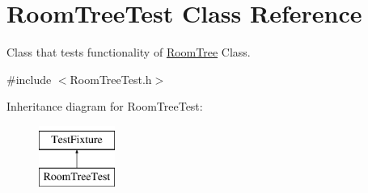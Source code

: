 \hypertarget{classRoomTreeTest}{\section{Room\-Tree\-Test Class Reference}
\label{classRoomTreeTest}
}


Class that tests functionality of \hyperlink{classRoomTree}{Room\-Tree} Class.  




{\ttfamily \#include $<$Room\-Tree\-Test.\-h$>$}

Inheritance diagram for Room\-Tree\-Test\-:\begin{figure}[H]
\begin{center}
\leavevmode
\includegraphics[height=2.000000cm]{classRoomTreeTest}
\end{center}
\end{figure}
